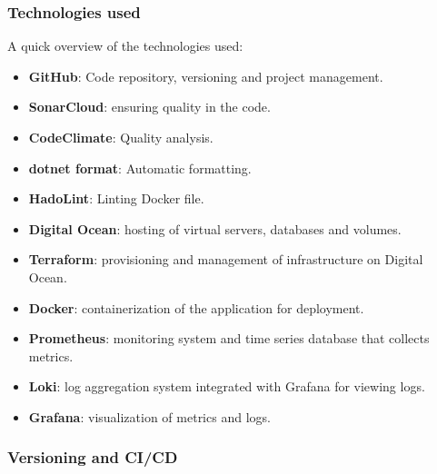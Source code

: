 \subsubsection{Technologies used}
A quick overview of the technologies used:
\begin{itemize}
    \item \textbf{GitHub}: Code repository, versioning and project management.
    \item \textbf{SonarCloud}: ensuring quality in the code.
    \item \textbf{CodeClimate}: Quality analysis.
    \item \textbf{dotnet format}: Automatic formatting.
    \item \textbf{HadoLint}: Linting Docker file.
    \item \textbf{Digital Ocean}: hosting of virtual servers, databases and volumes.
    \item \textbf{Terraform}: provisioning and management of infrastructure on Digital Ocean.
    \item \textbf{Docker}: containerization of the application for deployment.
    \item \textbf{Prometheus}: monitoring system and time series database that collects metrics.
    \item \textbf{Loki}: log aggregation system integrated with Grafana for viewing logs.
    \item \textbf{Grafana}: visualization of metrics and logs.
\end{itemize} 
\subsubsection{Versioning and CI/CD}


